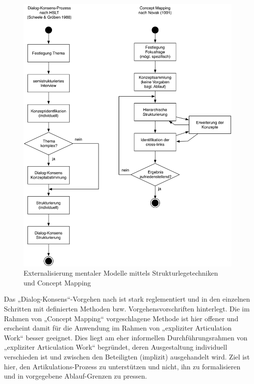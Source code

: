 \begin{figure}[htbp]
	\centering
		\includegraphics[width=\textwidth]{img/MentaleModelle/slt_cm.png}
	\caption{Externalisierung mentaler Modelle mittels Strukturlegetechniken und Concept Mapping}
	\label{fig:img_MentaleModelle_slt_cm}
\end{figure}

Das „Dialog-Konsens“-Vorgehen nach \citet{Scheele88} ist stark reglementiert und in den einzelnen Schritten mit definierten Methoden bzw. Vorgehensvorschriften hinterlegt. Die im Rahmen von „Concept Mapping“ vorgeschlagene Methode ist hier offener und erscheint damit für die Anwendung im Rahmen von „expliziter Articulation Work“ besser geeignet. Dies liegt am eher informellen Durchführungsrahmen von „expliziter Articulation Work“ begründet, deren Ausgestaltung individuell verschieden ist und zwischen den Beteiligten (implizit) ausgehandelt wird. Ziel ist hier, den Artikulations-Prozess zu unterstützen und nicht, ihn zu formalisieren und in vorgegebene Ablauf-Grenzen zu pressen. 

